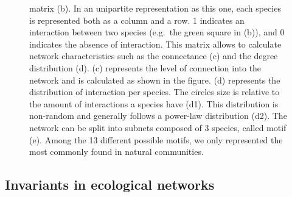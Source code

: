 \documentclass[12pt]{article}
\begin{document}
\begin{no-prefix-figure-caption}
\begin{figure}
{matrix (b). In an unipartite representation as this one, each species is
represented both as a column and a row. 1 indicates an interaction
between two species (e.g.~the green square in (b)), and 0 indicates the
absence of interaction. This matrix allows to calculate network
characteristics such as the connectance (c) and the degree distribution
(d). (c) represents the level of connection into the network and is
calculated as shown in the figure. (d) represents the distribution of
interaction per species. The circles size is relative to the amount of
interactions a species have (d1). This distribution is non-random and
generally follows a power-law distribution (d2). The network can be
split into subnets composed of 3 species, called motif (e). Among the 13
different possible motifs, we only represented the most commonly found
in natural communities.}
\end{figure}

\end{no-prefix-figure-caption}

\subsection{Invariants in ecological
networks}\label{invariants-in-ecological-networks}
\end{document}

